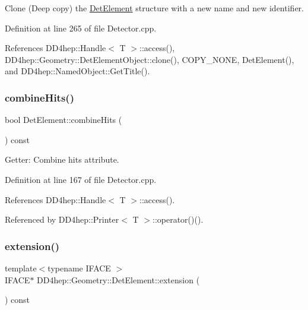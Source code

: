 Clone (Deep copy) the \hyperlink{class_d_d4hep_1_1_geometry_1_1_det_element}{Det\+Element} structure with a new name and new identifier. 



Definition at line 265 of file Detector.\+cpp.



References D\+D4hep\+::\+Handle$<$ T $>$\+::access(), D\+D4hep\+::\+Geometry\+::\+Det\+Element\+Object\+::clone(), C\+O\+P\+Y\+\_\+\+N\+O\+NE, Det\+Element(), and D\+D4hep\+::\+Named\+Object\+::\+Get\+Title().

\hypertarget{class_d_d4hep_1_1_geometry_1_1_det_element_a2db4456fa1a78240e8545c64be3436f4}{}\label{class_d_d4hep_1_1_geometry_1_1_det_element_a2db4456fa1a78240e8545c64be3436f4} 
\subsubsection{\texorpdfstring{combine\+Hits()}{combineHits()}}
{\footnotesize\ttfamily bool Det\+Element\+::combine\+Hits (\begin{DoxyParamCaption}{ }\end{DoxyParamCaption}) const}



Getter\+: Combine hits attribute. 



Definition at line 167 of file Detector.\+cpp.



References D\+D4hep\+::\+Handle$<$ T $>$\+::access().



Referenced by D\+D4hep\+::\+Printer$<$ T $>$\+::operator()().

\hypertarget{class_d_d4hep_1_1_geometry_1_1_det_element_a430cc85635e2eff2ff91239f0a405590}{}\label{class_d_d4hep_1_1_geometry_1_1_det_element_a430cc85635e2eff2ff91239f0a405590} 
\subsubsection{\texorpdfstring{extension()}{extension()}}
{\footnotesize\ttfamily template$<$typename I\+F\+A\+CE $>$ \\
I\+F\+A\+CE$\ast$ D\+D4hep\+::\+Geometry\+::\+Det\+Element\+::extension (\begin{DoxyParamCaption}{ }\end{DoxyParamCaption}) const\hspace{0.3cm}{\ttfamily [inline]}}




